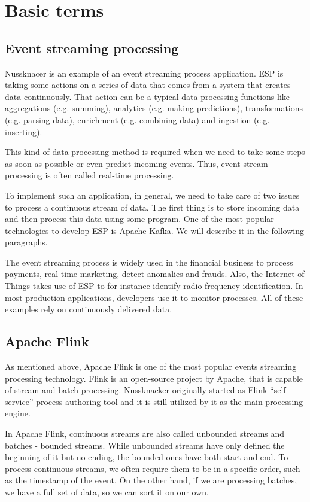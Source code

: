 \chapter{Basic terms}
\label{chap:basic}

\section{Event streaming processing}

Nussknacer is an example of an event streaming process application.
ESP is taking some actions on a series of data that comes from a system that creates data continuously.
That action can be a typical data processing functions like aggregations (e.g. summing),
analytics (e.g. making predictions), transformations (e.g. parsing data), enrichment (e.g. combining data)
and ingestion (e.g. inserting).

This kind of data processing method is required when we need to take some steps as soon as possible or even predict incoming events.
Thus, event stream processing is often called real-time processing.

To implement such an application, in general, we need to take care of two issues to process a continuous stream of data.
The first thing is to store incoming data and then process this data using some program.
One of the most popular technologies to develop ESP is Apache Kafka. We will describe it in the following paragraphs.

The event streaming process is widely used in the financial business to process payments, real-time marketing, detect anomalies and frauds.
Also, the Internet of Things takes use of ESP to for instance identify radio-frequency identification. In most production applications,
developers use it to monitor processes.
All of these examples rely on continuously delivered data.\cite{esp}

\section{Apache Flink}

As mentioned above, Apache Flink is one of the most popular events streaming processing technology.
Flink is an open-source project by Apache, that is capable of stream and batch processing. Nussknacker originally started
as Flink “self-service” process authoring tool and it is still utilized by it as the main processing engine.

In Apache Flink, continuous streams are also called unbounded streams and batches - bounded streams.
While unbounded streams have only defined the beginning of it but no ending, the bounded ones have both start and end.
To process continuous streams, we often require them to be in a specific order, such as the timestamp of the event.
On the other hand, if we are processing batches, we have a full set of data, so we can sort it on our own.

